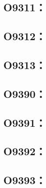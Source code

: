 \subsection{O9311：}



\clearpage
\subsection{O9312：}



\clearpage
\subsection{O9313：}



\clearpage
\subsection{O9390：}



\clearpage
\subsection{O9391：}



\subsection{O9392：}



\clearpage
\subsection{O9393：}

